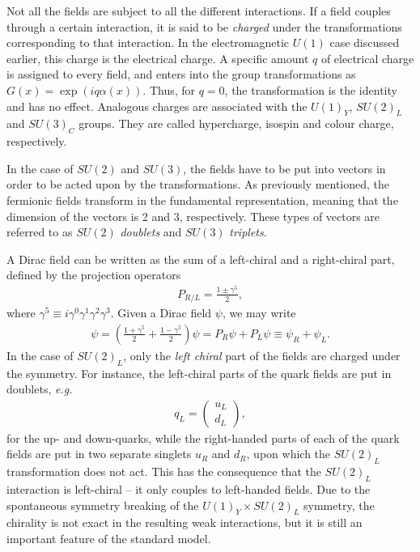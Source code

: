 \documentclass[twoside,english]{uiofysmaster}
\begin{document}
Not all the fields are subject to all the different interactions. If a field couples through a certain interaction, it is said to be {\it charged} under the transformations corresponding to that interaction. In the electromagnetic $U(1)$ case discussed earlier, this charge is the electrical charge. A specific amount $q$ of electrical charge is assigned to every field, and enters into the group transformations as $G(x) = \exp(iq\alpha(x))$. Thus, for $q=0$, the transformation is the identity and has no effect. Analogous charges are associated with the $U(1)_Y$, $SU(2)_L$ and $SU(3)_C$ groups. They are called hypercharge, isospin and colour charge, respectively.

In the case of $SU(2)$ and $SU(3)$, the fields have to be put into vectors in order to be acted upon by the transformations. As previously mentioned, the fermionic fields transform in the fundamental representation, meaning that the dimension of the vectors is 2 and 3, respectively. These types of vectors are referred to as $SU(2)$ {\it doublets} and $SU(3)$ {\it triplets}.

A Dirac field can be written as the sum of a left-chiral and a right-chiral part, defined by the projection operators 
\begin{align}
	P_{R/L} = \frac{1\pm \gamma^5}{2},
\end{align}
where $\gamma^5 \equiv i\gamma^0\gamma^1\gamma^2\gamma^3$. Given a Dirac field $\psi$, we may write
\begin{align}
	\psi = \left( \frac{1 + \gamma^5}{2} + \frac{1 - \gamma^5}{2}\right)\psi = P_R \psi + P_L \psi \equiv \psi_R + \psi_L.
\end{align}
In the case of $SU(2)_L$, only the {\it left chiral} part of the fields are charged under the symmetry. For instance, the left-chiral parts of the quark fields are put in doublets, {\it e.g.}\
\begin{align}
	q_L = \begin{pmatrix}
		u_L \\ d_L
	\end{pmatrix},
\end{align}
for the up- and down-quarks, while the right-handed parts of each of the quark fields are put in two separate singlets $u_R$ and $d_R$, upon which the $SU(2)_L$ transformation does not act. This has the consequence that the $SU(2)_L$ interaction is left-chiral -- it only couples to left-handed fields. Due to the spontaneous symmetry breaking of the $U(1)_Y\times SU(2)_L$ symmetry, the chirality is not exact in the resulting weak interactions, but it is still an important feature of the standard model.
\end{document}
